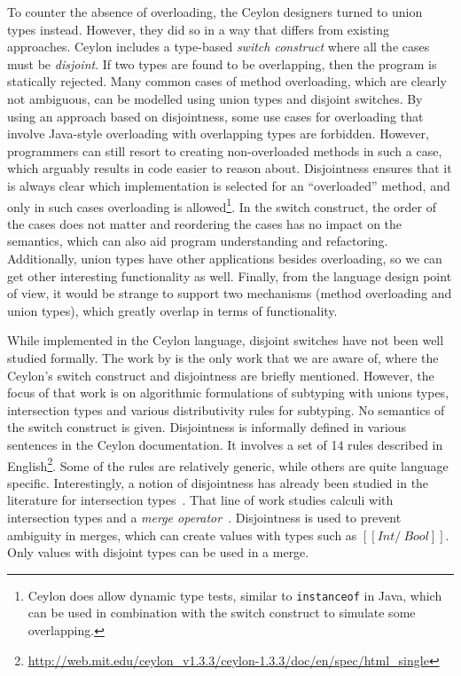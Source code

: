 To counter the absence of overloading, the Ceylon designers turned to
union types instead. However, they did so in a way that differs from
existing approaches. Ceylon includes a type-based 
\emph{switch construct} where all the cases must be \emph{disjoint}.  If
two types are found to be overlapping, then the program is statically
rejected. Many common cases of method overloading, which are clearly
not ambiguous, can be modelled using union types and disjoint switches.
By using an approach based on disjointness, some use cases for
overloading that involve Java-style overloading with
overlapping types are forbidden. However,
programmers can still resort to creating non-overloaded methods in
such a case, which arguably results in code easier to reason about.
Disjointness ensures that it is always
clear which implementation is selected for an ``overloaded'' method,
and only in such cases overloading is allowed\footnote{Ceylon does
  allow dynamic type tests, similar to \lstinline{instanceof} in Java, which can be used
  in combination with the switch construct to simulate some overlapping.}.
In the switch construct,
the order of the cases does not matter and reordering the cases has no
impact on the semantics, which can also aid program understanding and
refactoring.
Additionally, union types have other applications besides overloading,
so we can get other interesting functionality as well. Finally, from
the language design point of view, it would be strange to support two
mechanisms (method overloading and union types), which greatly overlap
in terms of functionality.

While implemented in the Ceylon language,
disjoint switches have not been well studied formally.
The work by \citet{muehlboeck2018empowering} is the only work that we are aware of,
where the Ceylon's switch construct
and disjointness are briefly mentioned. However, the focus 
of that work is on algorithmic formulations of subtyping
with unions types, intersection types and various distributivity
rules for subtyping. No semantics of the switch construct is given.
Disjointness is informally defined in various sentences in the
Ceylon documentation. It involves a set of 14 rules described in English\footnote{\url{http://web.mit.edu/ceylon_v1.3.3/ceylon-1.3.3/doc/en/spec/html_single}}. Some of the rules are relatively generic, while
others are quite language specific. 
Interestingly, a notion
of disjointness has already been studied in the literature
for intersection types~\cite{oliveira2016disjoint}. That line of work studies calculi
with intersection types and a \textit{merge operator}~\cite{reynolds1988preliminary}. Disjointness
is used to prevent ambiguity in merges, which can create
values with types such as $[[Int /\ Bool]]$. Only values
with disjoint types can be used in a merge.


